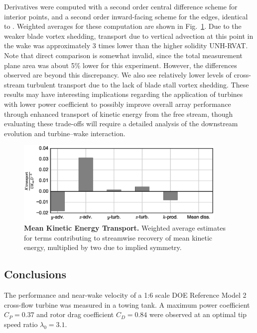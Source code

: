 \documentclass[10pt,letterpaper]{article}
\begin{document}
Derivatives were computed with a second order central difference scheme for
interior points, and a second order inward-facing scheme for the edges,
identical to \cite{Bachant2015-JoT}. Weighted averages for these computation are
shown in Fig.~\ref{fig:Ktransport}. Due to the weaker blade vortex shedding,
transport due to vertical advection at this point in the wake was approximately
3 times lower than the higher solidity UNH-RVAT. Note that direct comparison is
somewhat invalid, since the total measurement plane area was about 5\% lower for
this experiment. However, the differences observed are beyond this discrepancy.
We also see relatively lower levels of cross-stream turbulent transport due to
the lack of blade stall vortex shedding. These results may have interesting
implications regarding the application of turbines with lower power coefficient
to possibly improve overall array performance through enhanced transport of
kinetic energy from the free stream, though evaluating these trade-offs will
require a detailed analysis of the downstream evolution and turbine--wake
interaction.

\begin{figure}
    \includegraphics[width=0.9\textwidth]{figures/K_trans_bar_graph.eps}

    \caption{{\bf Mean Kinetic Energy Transport.} Weighted average estimates for
    terms contributing to streamwise recovery of mean kinetic energy, multiplied
    by two due to implied symmetry.}

    \label{fig:Ktransport}
\end{figure}


\subsection*{Conclusions}

The performance and near-wake velocity of a 1:6 scale DOE Reference Model 2
cross-flow turbine was measured in a towing tank. A maximum power coefficient
$C_P = 0.37$ and rotor drag coefficient $C_D = 0.84$ were observed at an optimal
tip speed ratio $\lambda_0 = 3.1$.
\end{document}
